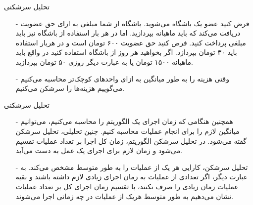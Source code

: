 \begin{frame}{‌تحلیل سرشکنی}
\begin{itemize}\itemr
\item[-]
فرض کنید عضو یک باشگاه می‌شوید. باشگاه از شما مبلغی به ازای حق عضویت دریافت می‌کند که باید ماهیانه بپردازید. اما در هر بار استفاده از باشگاه نیز باید مبلغی پرداخت کنید. فرض کنید حق عضویت ۶۰۰ تومان است و در هربار استفاده باید ۳۰ تومان بپردازد. اگر بخواهید هر روز از باشگاه استفاده کنید در واقع باید ماهیانه ۱۵۰۰ تومان یا به عبارت دیگر روزی ۵۰ تومان بپردازید.
\item[-]
وقتی هزینه را به طور میانگین به ازای واحدهای کوچک‌تر محاسبه می‌کنیم می‌گوییم هزینه‌ها را سرشکن
می‌کنیم.
\end{itemize}
\end{frame}


\begin{frame}{‌تحلیل سرشکنی}
\begin{itemize}\itemr
\item[-]
همچنین هنگامی که زمان اجرای یک الگوریتم را محاسبه می‌کنیم، می‌توانیم میانگین لازم را برای انجام عملیات محاسبه کنیم. چنین تحلیلی، تحلیل سرشکن
گفته می‌شود. در تحلیل سرشکن الگوریتم، زمان کل اجرا بر تعداد عملیات تقسیم می‌شود و زمان لازم برای اجرای یک عمل به دست می‌آید.
\item[-]
تحلیل سرشکن، کارایی هر یک از عملیات را به طور متوسط مشخص می‌کند.
به عبارت دیگر، اگر تعدادی از عملیات به زمان اجرای زیادی لازم داشته باشند و بقیه عملیات زمان زیادی را صرف نکنند، با تقسیم زمان اجرای کل بر تعداد عملیات نشان می‌دهیم به طور متوسط هریک از عملیات در چه زمانی اجرا می‌شوند.
\end{itemize}
\end{frame}